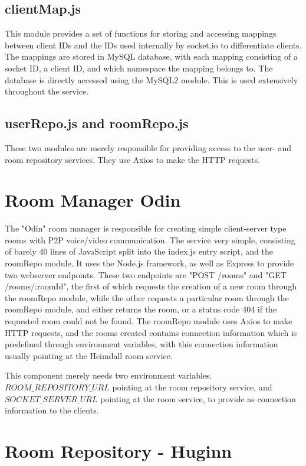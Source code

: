 \subsection{clientMap.js}

This module provides a set of functions for storing and accessing mappings between client IDs and the IDs used internally by socket.io to differentiate clients. The mappings are stored in MySQL database, with each mapping consisting of a socket ID, a client ID, and which namespace the mapping belongs to. The database is directly accessed using the MySQL2 module. This is used extensively throughout the service.

\subsection{userRepo.js and roomRepo.js}

These two modules are merely responsible for providing access to the user- and room repository services. They use Axios to make the HTTP requests.

\section{Room Manager Odin}

The "Odin" room manager is responsible for creating simple client-server type rooms with P2P voice/video communication. The service very simple, consisting of barely 40 lines of JavaScript split into the index.js entry script, and the roomRepo module. It uses the Node.js framework, as well as Express to provide two webserver endpoints. These two endpoints are "POST /rooms" and "GET /rooms/:roomId", the first of which requests the creation of a new room through the roomRepo module, while the other requests a particular room through the roomRepo module, and either returns the room, or a status code 404 if the requested room could not be found. The roomRepo module uses Axios to make HTTP requests, and the rooms created contains connection information which is predefined through environment variables, with this connection information usually pointing at the Heimdall room service.

This component merely needs two environment variables. $ROOM\_REPOSITORY\_URL$ pointing at the room repository service, and $SOCKET\_SERVER\_URL$ pointing at the room service, to provide as connection information to the clients.

\section{Room Repository - Huginn}

